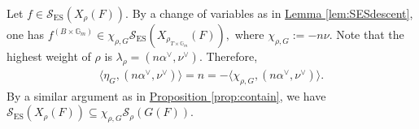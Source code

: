 \documentclass[10pt]{amsart}
\theoremstyle{definition}
\numberwithin{equation}{section}
\DeclareMathOperator{\GL}{\mathrm{GL}}
\DeclareMathOperator{\SL}{\mathrm{SL}}
\numberwithin{equation}{subsection}
\newcommand{\CC}{\mathbb{C}}
\newcommand{\GG}{\mathbb{G}}
\newenvironment{psmatrix}
  {\left(\begin{smallmatrix}}
  {\end{smallmatrix}\right)}
\begin{document}
Let $f\in \mathcal{S}_{\mathrm{ES}}(X_\rho(F)).$ By a change of variables as in \hyperref[lem:SESdescent]{Lemma \ref{lem:SESdescent}}, one has $f^{(B\times \GG_m)}\in \chi_{\rho,G}\mathcal{S}_{\mathrm{ES}}(X_{\rho_{T\times\GG_m}}(F)),$ where $\chi_{\rho,G}:=-n\nu$. Note that the highest weight of $\rho$ is $\lambda_\rho=(n\alpha^\lor,\nu^\lor).$ Therefore,
\begin{align*}
    \langle \eta_G,(n\alpha^\lor,\nu^\lor)\rangle=n=-\langle \chi_{\rho,G},(n\alpha^\lor,\nu^\lor)\rangle.
\end{align*}
By a similar argument as in \hyperref[prop:contain]{Proposition \ref{prop:contain}}, we have $\mathcal{S}_{\mathrm{ES}}(X_\rho(F))\subseteq \chi_{\rho,G}\mathcal{S}_\rho(G(F)).$ 






\end{document}
